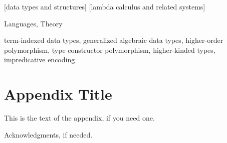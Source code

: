 \documentclass[preprint]{sigplanconf}
\theoremstyle{plain}
\theoremstyle{remark}
\theoremstyle{definition}
\begin{document}
[data types and structures]
[lambda calculus and related systems]

\terms
Languages, Theory

\keywords
term-indexed data types, generalized algebraic data types,
higher-order polymorphism, type constructor polymorphism, higher-kinded types,
impredicative encoding











\appendix
\section{Appendix Title}

This is the text of the appendix, if you need one.

\acks

Acknowledgments, if needed.






\end{document}
